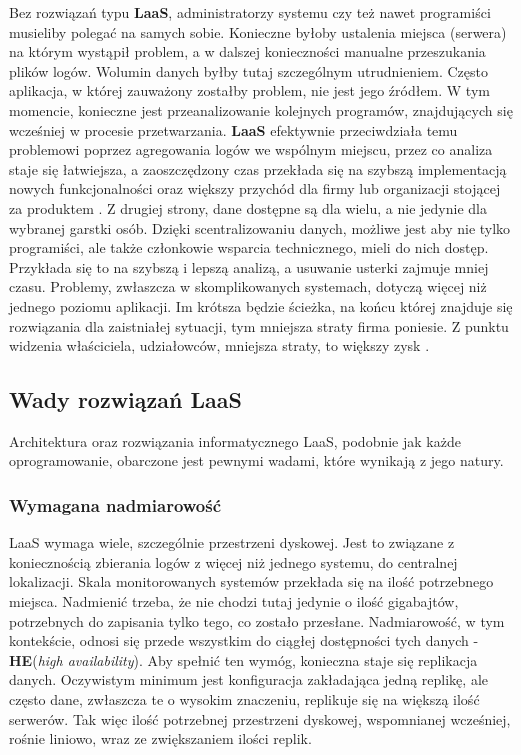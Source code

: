     Bez rozwiązań typu \textbf{LaaS}, administratorzy systemu czy też nawet programiści musieliby polegać
    na samych sobie. Konieczne byłoby ustalenia miejsca (serwera) na którym wystąpił problem, a w dalszej
    konieczności manualne przeszukania plików logów. Wolumin danych byłby tutaj szczególnym utrudnieniem.
    Często aplikacja, w której zauważony zostałby problem, nie jest jego źródłem. W tym momencie, konieczne
    jest przeanalizowanie kolejnych programów, znajdujących się wcześniej w procesie przetwarzania.
    \textbf{LaaS} efektywnie przeciwdziała temu problemowi poprzez agregowania logów we wspólnym miejscu,
    przez co analiza staje się łatwiejsza, a zaoszczędzony czas przekłada się na 
    szybszą implementacją nowych funkcjonalności oraz większy przychód dla firmy
    lub organizacji stojącej za produktem \cite{log_management_explained}. Z drugiej strony, dane dostępne
    są dla wielu, a nie jedynie dla wybranej garstki osób. Dzięki scentralizowaniu danych, możliwe jest
    aby nie tylko programiści, ale także członkowie wsparcia technicznego, mieli do nich dostęp.
    Przykłada się to na szybszą i lepszą analizą, a usuwanie usterki zajmuje mniej czasu. Problemy, zwłaszcza
    w skomplikowanych systemach, dotyczą więcej niż jednego poziomu aplikacji. Im krótsza będzie ścieżka,
    na końcu której znajduje się rozwiązania dla zaistniałej sytuacji, tym mniejsza straty firma poniesie.
    Z punktu widzenia właściciela, udziałowców, mniejsza straty, to większy zysk \cite{log_management_to_build_or_to_buy}.
    
    \subsection{Wady rozwiązań LaaS}
    Architektura oraz rozwiązania informatycznego LaaS, podobnie jak każde oprogramowanie, obarczone jest pewnymi
    wadami, które wynikają z jego natury. 
    
    \subsubsection{Wymagana nadmiarowość}
    \label{chapter:monitoring_architecture:laas:issue:data_size}
    LaaS wymaga wiele, szczególnie przestrzeni dyskowej. Jest to związane z koniecznością zbierania logów z więcej niż jednego
    systemu, do centralnej lokalizacji. Skala monitorowanych systemów przekłada się na ilość potrzebnego miejsca. Nadmienić trzeba, 
    że nie chodzi tutaj jedynie o ilość gigabajtów, potrzebnych do zapisania tylko tego, co zostało przesłane. Nadmiarowość, w tym kontekście,
    odnosi się przede wszystkim do ciągłej dostępności tych danych - \textbf{HE}(\textit{high availability}). Aby spełnić ten wymóg,
    konieczna staje się replikacja danych. Oczywistym minimum jest konfiguracja zakładająca jedną replikę, ale często dane, zwłaszcza te
    o wysokim znaczeniu, replikuje się na większą ilość serwerów. Tak więc ilość potrzebnej przestrzeni dyskowej, wspomnianej wcześniej,
    rośnie liniowo, wraz ze zwiększaniem ilości replik.
    

